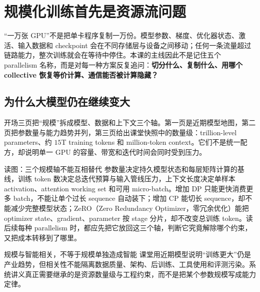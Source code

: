 \section{规模化训练首先是资源流问题}

“一万张 GPU”不是把单卡程序复制一万份。模型参数、梯度、优化器状态、激活、输入数据和 checkpoint 会在不同存储层与设备之间移动；任何一条流量超过链路能力，整次训练就会在等待中停住。本课的主线因此不是记住五个 parallelism 名称，而是对每一种方案反复追问：\textbf{切分什么、复制什么、用哪个 collective 恢复等价计算、通信能否被计算隐藏？}

\subsection{为什么大模型仍在继续变大}

开场三页把“规模”拆成模型、数据和上下文三个轴。第一页是近期模型地图，第二页把参数量与能力趋势并列，第三页给出课堂快照中的数量级：trillion-level parameters、约 $15$T training tokens 和 million-token context。它们不是统一配方，却说明单一 GPU 的容量、带宽和迭代时间会同时受到压力。




\begin{knowledgebox}{读图：三个规模轴不能互相替代}
参数量决定持久模型状态和每层矩阵计算的基线，训练 token 数决定总迭代预算与输入管线压力，上下文长度决定单样本 activation、attention working set 和可用 micro-batch。增加 DP 只能更快消费更多 batch，不能让单个过长 sequence 自动装下；增加 CP 能切长 sequence，却不能减少完整模型状态；ZeRO（Zero Redundancy Optimizer，零冗余优化）能把 optimizer state、gradient、parameter 按 stage 分片，却不改变总训练 token。读后续每种 parallelism 时，都应先把它放回这三个轴，判断它究竟解除哪个约束，又把成本转移到了哪里。
\end{knowledgebox}


\begin{warningbox}{规模与智能相关，不等于规模单独造成智能}
课堂用近期模型说明“训练更大”仍是产业趋势，但相关性不能隔离数据质量、架构、后训练、工具使用和评测污染。系统讲义真正需要继承的是资源数量级与工程约束，而不是把某个参数规模写成能力定律。
\end{warningbox}

